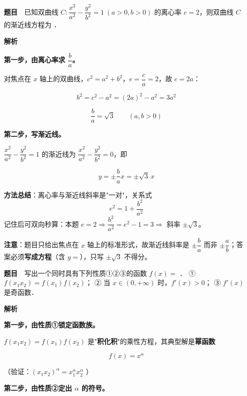 \par\medskip



\textbf{题目}　已知双曲线 $C:\dfrac{x^{2}}{a^{2}}-\dfrac{y^{2}}{b^{2}}=1\ (a>0,b>0)$ 的离心率 $e=2$，则双曲线 $C$ 的渐近线方程为 \gkblank{}．

\textbf{解析}

\textbf{第一步，由离心率求 $\dfrac ba$。}

对焦点在 $x$ 轴上的双曲线，$c^{2}=a^{2}+b^{2}$，$e=\dfrac ca=2$，故 $c=2a$：

\[b^{2}=c^{2}-a^{2}=(2a)^{2}-a^{2}=3a^{2}\]

\[\frac{b}{a}=\sqrt3\qquad(a,b>0)\]

\textbf{第二步，写渐近线。}

$\dfrac{x^{2}}{a^{2}}-\dfrac{y^{2}}{b^{2}}=1$ 的渐近线为 $\dfrac{x^{2}}{a^{2}}-\dfrac{y^{2}}{b^{2}}=0$，即

\[y=\pm\frac ba x=\pm\sqrt3\,x\]


\begin{gktip}
\textbf{方法总结}：离心率与渐近线斜率是"一对"，关系式
\[e^{2}=1+\frac{b^{2}}{a^{2}}\]
记住后可双向秒算：本题 $e=2\Rightarrow\dfrac{b^{2}}{a^{2}}=e^{2}-1=3\Rightarrow$ 斜率 $\pm\sqrt3$。

\textbf{注意}：题目只给出焦点在 $x$ 轴上的标准形式，故渐近线斜率是 $\pm\dfrac ba$ 而非 $\pm\dfrac ab$；答案必须\textbf{写成方程}（含 $y=$），只写 $\pm\sqrt3$ 不得分。
\end{gktip}

\par\medskip


\textbf{题目}　写出一个同时具有下列性质①②③的函数 $f(x)=$ \gkblank{}．
① $f\left(x_1x_2\right)=f\left(x_1\right)f\left(x_2\right)$；
② 当 $x\in(0,+\infty)$ 时，$f'(x)>0$；
③ $f'(x)$ 是奇函数．

\textbf{解析}

\textbf{第一步，由性质①锁定函数族。}

$f\left(x_1x_2\right)=f\left(x_1\right)f\left(x_2\right)$ 是"\textbf{积化积}"的乘性方程，其典型解是\textbf{幂函数}

\[f(x)=x^{\alpha}\]

（验证：$\left(x_1x_2\right)^{\alpha}=x_1^{\alpha}x_2^{\alpha}$ ）

\textbf{第二步，由性质②定出 $\alpha$ 的符号。}

